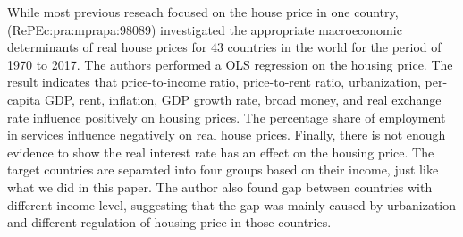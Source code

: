 \documentclass[11pt]{article}
\begin{document}
While most previous reseach focused on the house price in one country, (RePEc:pra:mprapa:98089) investigated the appropriate macroeconomic determinants of real house prices for 43 countries in the world for the period of 1970 to 2017. The authors performed a OLS regression on the housing price. The result indicates that price-to-income ratio, price-to-rent ratio, urbanization, per-capita GDP, rent, inflation, GDP growth rate, broad money, and real exchange rate influence positively on housing prices. The percentage share of employment in services influence negatively on real house prices. Finally, there is not enough evidence to show the real interest rate has an effect on the housing price. The target countries are separated into four groups based on their income, just like what we did in this paper. The author also found gap between countries with different income level, suggesting that the gap was mainly caused by urbanization and different regulation of housing price in those countries.





\end{document}
